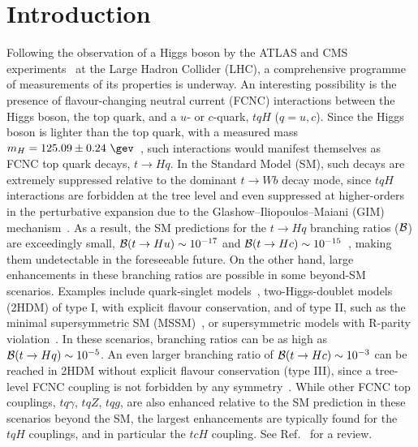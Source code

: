 
\section{Introduction}
\label{sec:intro}

Following the observation of a Higgs boson by the ATLAS and CMS experiments~\cite{Aad:2012tfa,Chatrchyan:2012ufa} at
the Large Hadron Collider (LHC), a comprehensive programme of measurements of its properties is underway.
An interesting possibility is the presence of flavour-changing neutral current (FCNC) interactions 
between the Higgs boson, the top quark, and a $u$- or $c$-quark, $tqH$ ($q=u,c$). Since the Higgs boson is lighter than the top quark, with a 
measured mass $m_H=125.09 \pm 0.24~\gev$~\cite{Aad:2015zhl}, such interactions would manifest themselves as FCNC top quark decays, $t\to H q$.  
In the Standard Model (SM), such decays are extremely suppressed relative to the dominant $t\to Wb$ decay mode, since $tqH$ 
interactions are forbidden at the tree level and even suppressed at higher-orders in the perturbative expansion due to the 
Glashow--Iliopoulos--Maiani (GIM) mechanism~\cite{Glashow:1970gm}.  As a result, the SM predictions for the $t \to Hq$ branching 
ratios ($\mathcal{B}$) are exceedingly small, $\mathcal{B}(t\to Hu) \sim 10^{-17} $ and $\mathcal{B}(t\to Hc) \sim 10^{-15}$~\cite{Eilam:1990zc,Mele:1998ag,AguilarSaavedra:2004wm,Zhang:2013xya}, making them undetectable in the foreseeable future.
On the other hand, large enhancements in these branching ratios are possible in some beyond-SM scenarios.
Examples include quark-singlet models~\cite{AguilarSaavedra:2002kr}, two-Higgs-doublet models (2HDM) of type I, with explicit flavour conservation,
and of type II, such as the minimal supersymmetric SM (MSSM)~\cite{Bejar:2000ub, Guasch:1999jp,Cao:2007dk}, or supersymmetric models
with R-parity violation~\cite{Eilam:2001dh}. In these scenarios, branching ratios can be as high as $\mathcal{B}(t\to Hq) \sim 10^{-5}$. 
An even larger branching ratio of  $\mathcal{B}(t\to Hc) \sim 10^{-3}$ can be reached in 2HDM without explicit flavour conservation (type III),
since a tree-level FCNC coupling is not forbidden by any symmetry~\cite{Cheng:1987rs,Baum:2008qm,Chen:2013qta}. 
While other FCNC top couplings, $tq\gamma$, $tqZ$, $tqg$, are also enhanced relative to the SM prediction in these scenarios beyond the SM, 
the largest enhancements are typically found for the $tqH$ couplings, and in particular the $tcH$ coupling. 
See Ref.~\cite{AguilarSaavedra:2004wm} for a review.

